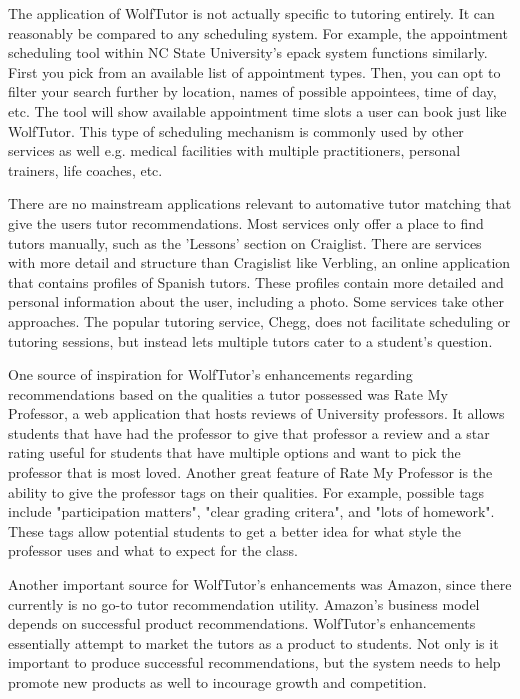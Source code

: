 The application of WolfTutor is not actually specific to tutoring entirely.
It can reasonably be compared to any scheduling system.
For example, the appointment scheduling tool within NC State University's epack system functions similarly.
First you pick from an available list of appointment types. Then, you can opt to filter your search further by location, names of possible appointees, time of day, etc.
The tool will show available appointment time slots a user can book just like WolfTutor.
This type of scheduling mechanism is commonly used by other services as well e.g. medical facilities with multiple practitioners, personal trainers, life coaches, etc.

There are no mainstream applications relevant to automative tutor matching that give the users tutor recommendations. 
Most services only offer a place to find tutors manually, such as the 'Lessons' section on Craiglist. \cite{RefWorks:doc:5abd46a5e4b0770b05a4080c} 
There are services with more detail and structure than Cragislist like Verbling, an online application that contains profiles of Spanish tutors. 
These profiles contain more detailed and personal information about the user, including a photo. \cite{RefWorks:doc:5abd466ce4b0689719ee9277} 
Some services take other approaches. 
The popular tutoring service, Chegg, does not facilitate scheduling or tutoring sessions, but instead lets multiple tutors cater to a student's question. \cite{RefWorks:doc:5abd45f7e4b0770b05a407c4}

One source of inspiration for WolfTutor's enhancements regarding recommendations 
based on the qualities a tutor possessed was Rate My Professor, a web application that hosts reviews of University professors. 
It allows students that have had the professor to give that professor a review and a star rating useful for
students that have multiple options and want to pick the professor that is most loved. Another great
feature of Rate My Professor is the ability to give the professor tags on their qualities. For example, possible tags
include "participation matters", "clear grading critera", and "lots of homework". \cite{rate-my-prof} These tags allow potential students to
get a better idea for what style the professor uses and what to expect for the class.

Another important source for WolfTutor's enhancements was Amazon, since there currently is 
no go-to tutor recommendation utility.\cite{amazon} Amazon's business model depends on successful product recommendations.
WolfTutor's enhancements essentially attempt to market the tutors as a product to students. Not only is it important
to produce successful recommendations, but the system needs to help promote new products as well to incourage 
growth and competition.




